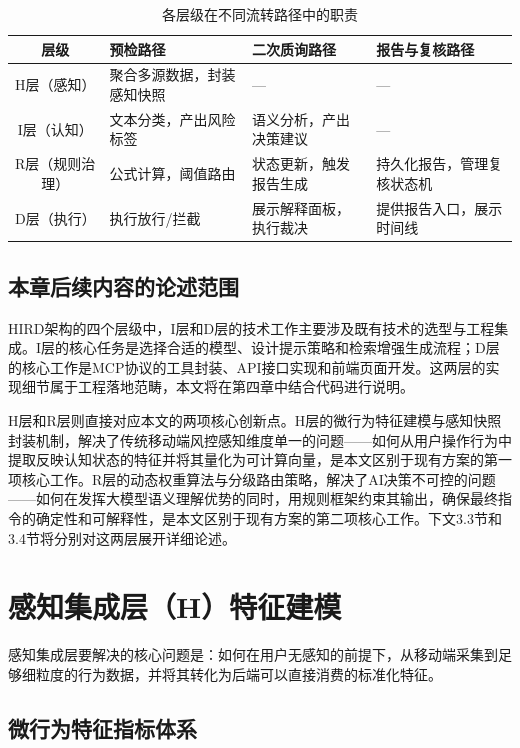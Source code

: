 \documentclass{xduugthesis}
\begin{document}
\begin{table}[H]
    \centering
    \caption{各层级在不同流转路径中的职责}
    \label{tab:layer-responsibility}
    \begin{tabular}{|c|p{3cm}|p{3cm}|p{3cm}|}
        \hline
        层级 & 预检路径 & 二次质询路径 & 报告与复核路径 \\
        \hline
        H层（感知） & 聚合多源数据，封装感知快照 & — & — \\
        \hline
        I层（认知） & 文本分类，产出风险标签 & 语义分析，产出决策建议 & — \\
        \hline
        R层（规则治理） & 公式计算，阈值路由 & 状态更新，触发报告生成 & 持久化报告，管理复核状态机 \\
        \hline
        D层（执行） & 执行放行/拦截 & 展示解释面板，执行裁决 & 提供报告入口，展示时间线 \\
        \hline
    \end{tabular}
\end{table}

\subsection{本章后续内容的论述范围}

HIRD架构的四个层级中，I层和D层的技术工作主要涉及既有技术的选型与工程集成。I层的核心任务是选择合适的模型、设计提示策略和检索增强生成流程；D层的核心工作是MCP协议的工具封装、API接口实现和前端页面开发。这两层的实现细节属于工程落地范畴，本文将在第四章中结合代码进行说明。

H层和R层则直接对应本文的两项核心创新点。H层的微行为特征建模与感知快照封装机制，解决了传统移动端风控感知维度单一的问题——如何从用户操作行为中提取反映认知状态的特征并将其量化为可计算向量，是本文区别于现有方案的第一项核心工作。R层的动态权重算法与分级路由策略，解决了AI决策不可控的问题——如何在发挥大模型语义理解优势的同时，用规则框架约束其输出，确保最终指令的确定性和可解释性，是本文区别于现有方案的第二项核心工作。下文3.3节和3.4节将分别对这两层展开详细论述。

\section{感知集成层（H）特征建模}

感知集成层要解决的核心问题是：如何在用户无感知的前提下，从移动端采集到足够细粒度的行为数据，并将其转化为后端可以直接消费的标准化特征。

\subsection{微行为特征指标体系}
\end{document}
